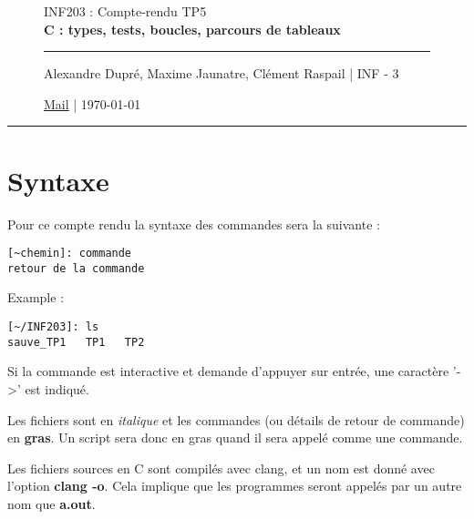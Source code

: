\documentclass[12pt,a4paper,notitlepage,colorinlistoftodos]{article}
\begin{document}
\begin{figure}
    \begin{minipage}{.75\textwidth}
    \begin{center}
    {\Large INF203 : Compte-rendu TP5 \\ \textbf{C : types, tests, boucles, parcours de tableaux}}
    \end{center}
    \rule{7em}{.4pt}\par
     Alexandre Dupré, Maxime Jaunatre, Clément Raspail | INF - 3 \par 
     \href{mailto:alexandre.dupre@etu.univ-grenoble-alpes.fr,maxime.jaunatre@etu.univ-grenoble-alpes.fr, clement.raspail@etu.univ-grenoble-alpes.fr}{Mail} | \today
\end{minipage}
\end{figure}

\hrule

\section*{Syntaxe}

\iffalse
 Alexandre Dupré <alexandre.dupre@etu.univ-grenoble-alpes.fr>
 Maxime Jaunatre <maxime.jaunatre@etu.univ-grenoble-alpes.fr> 
 Clément Raspail <clement.raspail@etu.univ-grenoble-alpes.fr>
\fi

Pour ce compte rendu la syntaxe des commandes sera la suivante :
\begin{lstlisting}
[~chemin]: commande
retour de la commande
\end{lstlisting}

Example :
\begin{lstlisting}
[~/INF203]: ls
sauve_TP1   TP1   TP2
\end{lstlisting}

Si la commande est interactive et demande d'appuyer  sur entrée, une caractère '->' est indiqué.

Les fichiers sont en \textit{italique} et les commandes (ou détails de retour de commande) en \textbf{gras}. Un script sera donc en gras quand il sera appelé comme une commande.


Les fichiers sources en C sont compilés avec clang, et un nom est donné avec l'option \textbf{clang -o}. Cela implique que les programmes seront appelés par un autre nom que \textbf{a.out}.
\end{document}
